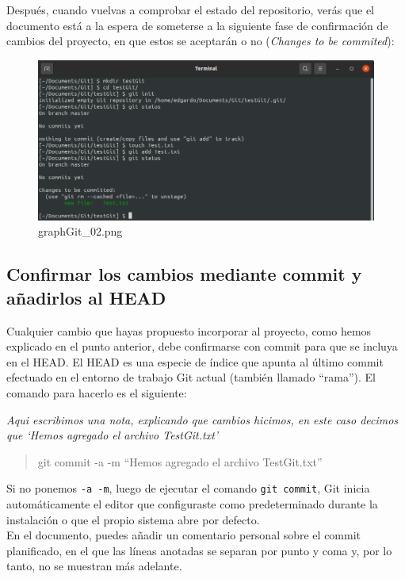 \documentclass[11pt]{article}
\begin{document}
Después, cuando vuelvas a comprobar el estado del repositorio, verás que
el documento está a la espera de someterse a la siguiente fase de
confirmación de cambios del proyecto, en que estos se aceptarán o no
(\emph{Changes to be commited}):

    \begin{figure}
\centering
\includegraphics{graphGit_02.png}
\caption{graphGit\_02.png}
\end{figure}

    \hypertarget{confirmar-los-cambios-mediante-commit-y-auxf1adirlos-al-head}{%
\subsection{Confirmar los cambios mediante commit y añadirlos al
HEAD}\label{confirmar-los-cambios-mediante-commit-y-auxf1adirlos-al-head}}

Cualquier cambio que hayas propuesto incorporar al proyecto, como hemos
explicado en el punto anterior, debe confirmarse con commit para que se
incluya en el HEAD. El HEAD es una especie de índice que apunta al
último commit efectuado en el entorno de trabajo Git actual (también
llamado ``rama''). El comando para hacerlo es el siguiente:

\emph{Aqui escribimos una nota, explicando que cambios hicimos, en este
caso decimos que `Hemos agregado el archivo TestGit.txt'}

\begin{quote}
git commit -a -m ``Hemos agregado el archivo TestGit.txt''
\end{quote}

Si no ponemos \texttt{-a\ -m}, luego de ejecutar el comando
\texttt{git\ commit}, Git inicia automáticamente el editor que
configuraste como predeterminado durante la instalación o que el propio
sistema abre por defecto.\\
En el documento, puedes añadir un comentario personal sobre el commit
planificado, en el que las líneas anotadas se separan por punto y coma
y, por lo tanto, no se muestran más adelante.
\end{document}
